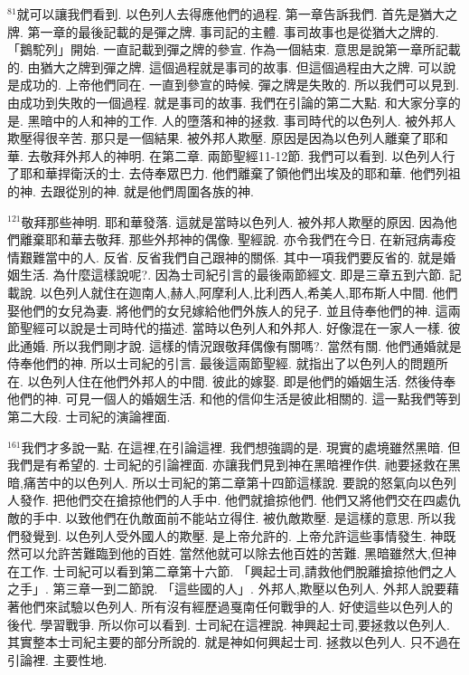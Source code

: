 \documentclass{book}
\begin{document}
$^{81}$就可以讓我們看到.
以色列人去得應他們的過程.
第一章告訴我們.
首先是猶大之牌.
第一章的最後記載的是彈之牌.
事司記的主體.
事司故事也是從猶大之牌的.
「鵝駝列」開始.
一直記載到彈之牌的參宣.
作為一個結束.
意思是說第一章所記載的.
由猶大之牌到彈之牌.
這個過程就是事司的故事.
但這個過程由大之牌.
可以說是成功的.
上帝他們同在.
一直到參宣的時候.
彈之牌是失敗的.
所以我們可以見到.
由成功到失敗的一個過程.
就是事司的故事.
我們在引論的第二大點.
和大家分享的是.
黑暗中的人和神的工作.
人的墮落和神的拯救.
事司時代的以色列人.
被外邦人欺壓得很辛苦.
那只是一個結果.
被外邦人欺壓.
原因是因為以色列人離棄了耶和華.
去敬拜外邦人的神明.
在第二章.
兩節聖經11-12節.
我們可以看到.
以色列人行了耶和華捍衛沃的士.
去侍奉眾巴力.
他們離棄了領他們出埃及的耶和華.
他們列祖的神.
去跟從別的神.
就是他們周圍各族的神.

$^{121}$敬拜那些神明.
耶和華發落.
這就是當時以色列人.
被外邦人欺壓的原因.
因為他們離棄耶和華去敬拜.
那些外邦神的偶像.
聖經說.
亦令我們在今日.
在新冠病毒疫情艱難當中的人.
反省.
反省我們自己跟神的關係.
其中一項我們要反省的.
就是婚姻生活.
為什麼這樣說呢?.
因為士司紀引言的最後兩節經文.
即是三章五到六節.
記載說.
以色列人就住在迦南人,赫人,阿摩利人,比利西人,希美人,耶布斯人中間.
他們娶他們的女兒為妻.
將他們的女兒嫁給他們外族人的兒子.
並且侍奉他們的神.
這兩節聖經可以說是士司時代的描述.
當時以色列人和外邦人.
好像混在一家人一樣.
彼此通婚.
所以我們剛才說.
這樣的情況跟敬拜偶像有關嗎?.
當然有關.
他們通婚就是侍奉他們的神.
所以士司紀的引言.
最後這兩節聖經.
就指出了以色列人的問題所在.
以色列人住在他們外邦人的中間.
彼此的嫁娶.
即是他們的婚姻生活.
然後侍奉他們的神.
可見一個人的婚姻生活.
和他的信仰生活是彼此相關的.
這一點我們等到第二大段.
士司紀的演論裡面.

$^{161}$我們才多說一點.
在這裡,在引論這裡.
我們想強調的是.
現實的處境雖然黑暗.
但我們是有希望的.
士司紀的引論裡面.
亦讓我們見到神在黑暗裡作供.
祂要拯救在黑暗,痛苦中的以色列人.
所以士司紀的第二章第十四節這樣說.
要說的怒氣向以色列人發作.
把他們交在搶掠他們的人手中.
他們就搶掠他們.
他們又將他們交在四處仇敵的手中.
以致他們在仇敵面前不能站立得住.
被仇敵欺壓.
是這樣的意思.
所以我們發覺到.
以色列人受外國人的欺壓.
是上帝允許的.
上帝允許這些事情發生.
神既然可以允許苦難臨到他的百姓.
當然他就可以除去他百姓的苦難.
黑暗雖然大,但神在工作.
士司紀可以看到第二章第十六節.
「興起士司,請救他們脫離搶掠他們之人之手」.
第三章一到二節說.
「這些國的人」.
外邦人,欺壓以色列人.
外邦人說要藉著他們來試驗以色列人.
所有沒有經歷過戛南任何戰爭的人.
好使這些以色列人的後代.
學習戰爭.
所以你可以看到.
士司紀在這裡說.
神興起士司,要拯救以色列人.
其實整本士司紀主要的部分所說的.
就是神如何興起士司.
拯救以色列人.
只不過在引論裡.
主要性地.
\end{document}
